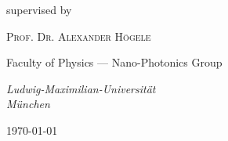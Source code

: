 \begin{titlepage}
	\vspace{10\baselineskip} %
	
	supervised by

	\vspace{0.3\baselineskip} %

	{\scshape\Large Prof. Dr. Alexander Högele \\} %

	\vspace{0.5\baselineskip}

	Faculty of Physics --- Nano-Photonics Group

	\vspace{0.5\baselineskip}

	\textit{Ludwig-Maximilian-Universität \\ München} %

	\vfill %
	
	
	
	\vspace{0.3\baselineskip} %
	
	\today%
	

\end{titlepage}

